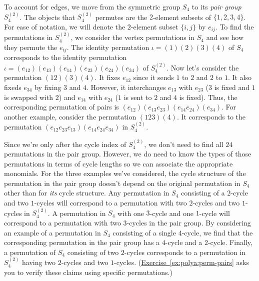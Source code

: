 To account for edges, we move from the symmetric group $S_4$ to its
\emph{pair group} $S_4^{(2)}$. The objects that $S_4^{(2)}$ permutes
are the $2$-element subsets of $\{1,2,3,4\}$. For ease of notation, we
will denote the $2$-element subset $\{i,j\}$ by $e_{ij}$. To find the
permutations in $S_4^{(2)}$, we consider the vertex permutations in
$S_4$ and see how they permute the $e_{ij}$. The identity permutation
$\iota=(1)(2)(3)(4)$ of $S_4$ corresponds to the identity permutation
$\iota=(e_{12})(e_{13}) (e_{14}) (e_{23}) (e_{24}) (e_{34})$ of
$S_4^{(2)}$. Now let's consider the permutation $(12)(3)(4)$. It fixes
$e_{12}$ since it sends $1$ to $2$ and $2$ to $1$. It also fixeds
$e_{34}$ by fixing $3$ and $4$. However, it interchanges $e_{13}$ with
$e_{23}$ ($3$ is fixed and $1$ is swapped with $2$) and $e_{14}$ with
$e_{24}$ ($1$ is sent to $2$ and $4$ is fixed). Thus, the
corresponding permutation of pairs is
$(e_{12})(e_{13}e_{23})(e_{14}e_{24})(e_{34})$. For another example,
consider the permutation $(123)(4)$. It corresponds to the permutation
$(e_{12}e_{23}e_{13})(e_{14}e_{24}e_{34})$ in $S_4^{(2)}$.

Since we're only after the cycle index of $S_4^{(2)}$, we don't need
to find all $24$ permutations in the pair group. However, we do need
to know the types of those permutations in terms of cycle lengths so
we can associate the appropriate monomials. For the three examples
we've considered, the cycle structure of the permutation in the pair
group doesn't depend on the original permutation in $S_4$ other than
for \emph{its} cycle structure. Any permutation in $S_4$ consisting of
a $2$-cycle and two $1$-cycles will correspond to a permutation with
two $2$-cycles and two $1$-cycles in $S_4^{(2)}$. A permutation in
$S_4$ with one $3$-cycle and one $1$-cycle will correspond to a
permutation with two $3$-cycles in the pair group. By considering an
example of a permutation in $S_4$ consisting of a single $4$-cycle, we
find that the corresponding permutation in the pair group has a
$4$-cycle and a $2$-cycle. Finally, a permutation of $S_4$ consisting
of two $2$-cycles corresponds to a permutation in $S_4^{(2)}$ having
two $2$-cycles and two
$1$-cycles. (\hyperref[ex:polya:perm-pairs]{Exercise~\ref*{ex:polya:perm-pairs}}
asks you to verify these claims using specific permutations.)

